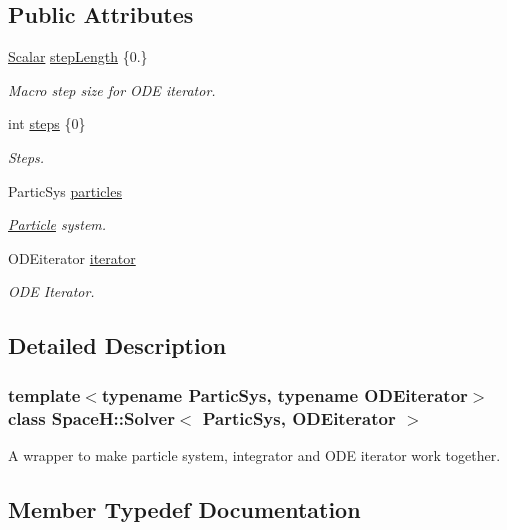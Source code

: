 \subsection*{Public Attributes}
\begin{DoxyCompactItemize}
\item 
\mbox{\hyperlink{class_space_h_1_1_solver_aa0ade682bd07e13fef77e7dcbeb6b46a}{Scalar}} \mbox{\hyperlink{class_space_h_1_1_solver_ab48648625039dbf5730a6499ecbe7ce2}{step\+Length}} \{0.\}
\begin{DoxyCompactList}\small\item\em Macro step size for O\+DE iterator. \end{DoxyCompactList}\item 
int \mbox{\hyperlink{class_space_h_1_1_solver_ae6798bb49a2bcc64657c6b7b6fb48181}{steps}} \{0\}
\begin{DoxyCompactList}\small\item\em Steps. \end{DoxyCompactList}\item 
Partic\+Sys \mbox{\hyperlink{class_space_h_1_1_solver_a74790be198a2d8b73eb68108a94edeb6}{particles}}
\begin{DoxyCompactList}\small\item\em \mbox{\hyperlink{struct_space_h_1_1_particle}{Particle}} system. \end{DoxyCompactList}\item 
O\+D\+Eiterator \mbox{\hyperlink{class_space_h_1_1_solver_a874a6878de65c4e4b20a766d7d262a3c}{iterator}}
\begin{DoxyCompactList}\small\item\em O\+DE Iterator. \end{DoxyCompactList}\end{DoxyCompactItemize}


\subsection{Detailed Description}
\subsubsection*{template$<$typename Partic\+Sys, typename O\+D\+Eiterator$>$\newline
class Space\+H\+::\+Solver$<$ Partic\+Sys, O\+D\+Eiterator $>$}

A wrapper to make particle system, integrator and O\+DE iterator work together. 

\subsection{Member Typedef Documentation}
\mbox{\label{class_space_h_1_1_solver_aa0ade682bd07e13fef77e7dcbeb6b46a}} 
